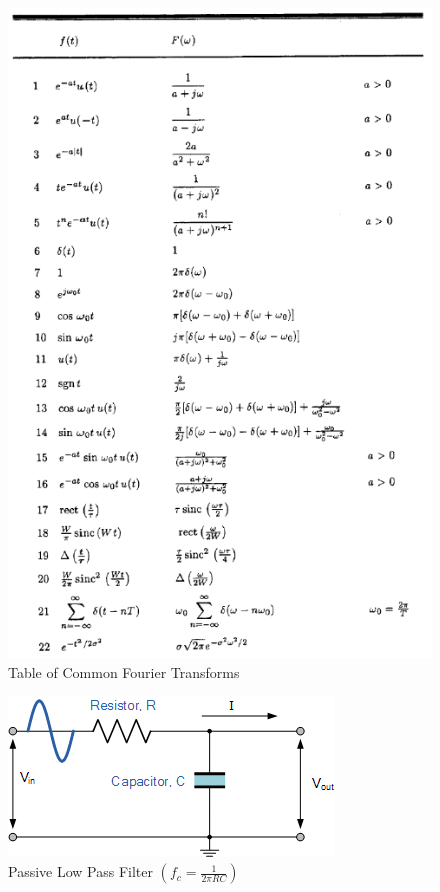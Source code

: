     \begin{figure}[H]
      \centering
      \includegraphics[height=.9\textheight]{Figures/FTT.png}
      \caption{Table of Common Fourier Transforms}
      \label{fig:3}
    \end{figure}

      \begin{figure}[H]
        \centering
        \includegraphics[width=.45\textwidth]{Figures/PLP.png}
        \caption{Passive Low Pass Filter $\left( f_c=\frac{1}{2\pi RC} \right)$}
        \label{fig:4}
      \end{figure}

